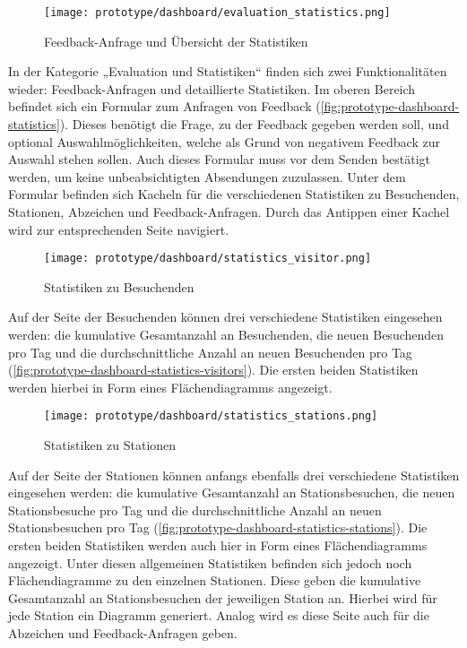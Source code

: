 \begin{figure}[htpb]
    \centering
    \texttt{[image: prototype/dashboard/evaluation\_statistics.png]}
    \caption{Feedback-Anfrage und Übersicht der Statistiken}
    \label{fig:prototype-dashboard-statistics}
\end{figure}

In der Kategorie „Evaluation und Statistiken“ finden sich zwei Funktionalitäten
wieder: Feedback-Anfragen und detaillierte Statistiken. Im oberen Bereich
befindet sich ein Formular zum Anfragen von Feedback (\autoref{fig:prototype-dashboard-statistics}). Dieses benötigt die Frage, zu der
Feedback gegeben werden soll, und optional Auswahlmöglichkeiten, welche als
Grund von negativem Feedback zur Auswahl stehen sollen. Auch dieses Formular
muss vor dem Senden bestätigt werden, um keine unbeabsichtigten Absendungen
zuzulassen. Unter dem Formular befinden sich Kacheln für die verschiedenen
Statistiken zu Besuchenden, Stationen, Abzeichen und Feedback-Anfragen. Durch
das Antippen einer Kachel wird zur entsprechenden Seite navigiert.

\begin{figure}[htpb]
    \centering
    \texttt{[image: prototype/dashboard/statistics\_visitor.png]}
    \caption{Statistiken zu Besuchenden}
    \label{fig:prototype-dashboard-statistics-visitors}
\end{figure}

Auf der Seite der Besuchenden können drei verschiedene Statistiken eingesehen
werden: die kumulative Gesamtanzahl an Besuchenden, die neuen Besuchenden pro
Tag und die durchschnittliche Anzahl an neuen Besuchenden pro Tag (\autoref{fig:prototype-dashboard-statistics-visitors}). Die ersten
beiden Statistiken werden hierbei in Form eines Flächendiagramms angezeigt.

\begin{figure}[htpb]
    \centering
    \texttt{[image: prototype/dashboard/statistics\_stations.png]}
    \caption{Statistiken zu Stationen}
    \label{fig:prototype-dashboard-statistics-stations}
\end{figure}

Auf der Seite der Stationen können anfangs ebenfalls drei verschiedene
Statistiken eingesehen werden: die kumulative Gesamtanzahl an Stationsbesuchen,
die neuen Stationsbesuche pro Tag und die durchschnittliche Anzahl an neuen
Stationsbesuchen pro Tag (\autoref{fig:prototype-dashboard-statistics-stations}). Die ersten beiden Statistiken werden auch hier in Form
eines Flächendiagramms angezeigt. Unter diesen allgemeinen Statistiken befinden
sich jedoch noch Flächendiagramme zu den einzelnen Stationen. Diese geben die
kumulative Gesamtanzahl an Stationsbesuchen der jeweiligen Station an. Hierbei
wird für jede Station ein Diagramm generiert. Analog wird es diese Seite auch
für die Abzeichen und Feedback-Anfragen geben.

